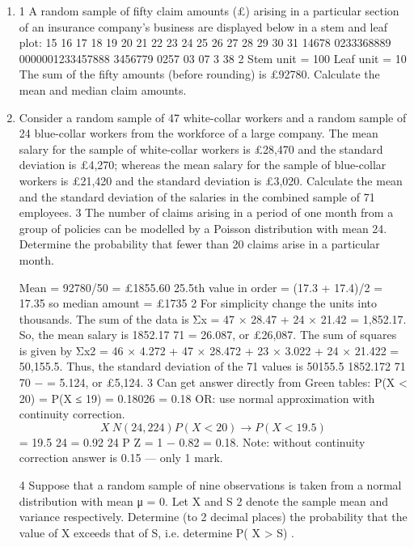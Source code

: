 \documentclass[a4paper,12pt]{article}
\begin{document}
\begin{enumerate}
\item 1 A random sample of fifty claim amounts (£) arising in a particular section of an
insurance company's business are displayed below in a stem and leaf plot:
15
16
17
18
19
20
21
22
23
24
25
26
27
28
29
30
31
14678
0233368889
0000001233457888
3456779
0257
03
07
3
38
2
Stem unit = 100
Leaf unit = 10
The sum of the fifty amounts (before rounding) is £92780.
Calculate the mean and median claim amounts. 
\item Consider a random sample of 47 white-collar workers and a random sample of 24 blue-collar workers from the workforce of a large company. The mean salary for
the sample of white-collar workers is £28,470 and the standard deviation is £4,270; whereas the mean salary for the sample of blue-collar workers is £21,420
and the standard deviation is £3,020.
Calculate the mean and the standard deviation of the salaries in the combined
sample of 71 employees. 
3 The number of claims arising in a period of one month from a group of policies
can be modelled by a Poisson distribution with mean 24.
Determine the probability that fewer than 20 claims arise in a particular month.



 Mean = 92780/50 = £1855.60
25.5th value in order = (17.3 + 17.4)/2 = 17.35 so median amount = £1735
2 For simplicity change the units into thousands. The sum of the data is
Σx = 47 × 28.47 + 24 × 21.42 = 1,852.17.
So, the mean salary is 1852.17
71 = 26.087, or £26,087.
The sum of squares is given by
Σx2 = {46 × 4.272 + 47 × 28.472} + {23 × 3.022 + 24 × 21.422} = 50,155.5.
Thus, the standard deviation of the 71 values is
50155.5 1852.172 71
70
−
= 5.124, or £5,124.
3 Can get answer directly from Green tables:
P(X < 20) = P(X ≤ 19) = 0.18026 = 0.18
OR: use normal approximation with continuity correction.
\[X ~ N(24, 2 24 )
P(X < 20) → P(X < 19.5)\]
=
19.5 24
= 0.92
24
P Z
= 1 − 0.82 = 0.18.
Note: without continuity correction answer is 0.15 — only 1 mark.
\newpage


4 Suppose that a random sample of nine observations is taken from a normal
distribution with mean μ = 0. Let X and S 2 denote the sample mean and
variance respectively.
Determine (to 2 decimal places) the probability that the value of X exceeds that of S, i.e. determine P( X > S) . 


\end{enumerate}
\end{document}

